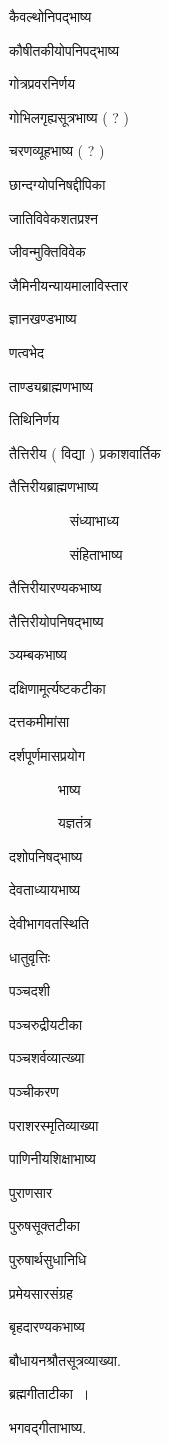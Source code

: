 \documentclass[11pt, openany]{book}
\begin{document}
\begin{multicols}{2}
कैवल्थोनिपद्भाष्य 

कौषीतकीयोपनिपद्भाष्य 

गोत्रप्रवरनिर्णय 

गोभिलगृह्यसूत्रभाष्य ( ? ) 

चरणव्यूहभाष्य ( ? ) 

छान्दग्योपनिषद्दीपिका 

जातिविवेकशतप्रश्न 

जीवन्मुक्तिविवेक 

जैमिनीयन्यायमालाविस्तार 

ज्ञानखण्डभाष्य 

णत्वभेद 

ताण्ड्यब्राह्मणभाष्य 

तिथिनिर्णय 

तैत्तिरीय ( विद्या ) प्रकाशवार्तिक 

तैत्तिरीयब्राह्मणभाष्य 

~~~~~~~ \textendash\ संध्याभाध्य 

~~~~~~~ \textendash\ संहिताभाष्य 

तैत्तिरीयारण्यकभाष्य 

तैत्तिरीयोपनिषद्भाष्य 

ञ्यम्बकभाष्य 

दक्षिणामूर्त्यष्टकटीका 

दत्तकमीमांसा 

दर्शपूर्णमासप्रयोग 

~~~~~~~भाष्य 

~~~~~~~यज्ञतंत्र 

दशोपनिषद्भाष्य 

देवताध्यायभाष्य 

देवीभागवतस्थिति 

धातुवृत्तिः 

पञ्चदशी 

पञ्चरुद्रीयटीका 

पञ्चशर्वव्यात्ख्या 

पञ्चीकरण 

पराशरस्मृतिव्याख्या 

पाणिनीयशिक्षाभाष्य 

पुराणसार 

पुरुषसूक्तटीका 

पुरुषार्थसुधानिधि 

प्रमेयसारसंग्रह 

बृहदारण्यकभाष्य 

बौधायनश्रौतसूत्रव्याख्या. 

ब्रह्मगीताटीका~। 

भगवद्गीताभाष्य.


\end{multicols}
\end{document}
